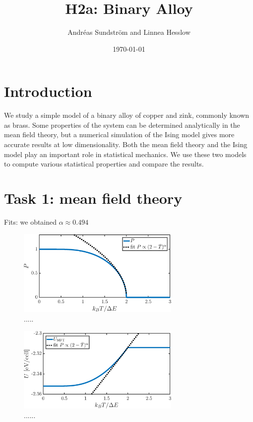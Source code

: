 
\usepackage{units}
\usepackage{physics}

\newcommand{\ee}{\mathrm{e}}
\newcommand{\ii}{\mathrm{i}}

\title{H2a: Binary Alloy}
\author{Andr\'eas Sundstr\"om and Linnea Hesslow}
\date{\today}





\section*{Introduction}
We study a simple model of a binary alloy of copper and zink, commonly known as brass. Some properties of the system can be determined analytically in the mean field theory, but a numerical simulation of the Ising model gives more accurate results at low dimensionality. Both the mean field theory and the Ising model play an important role in statistical mechanics. We use these two models to compute various statistical properties and compare the results. 

\section*{Task 1: mean field theory}
Fits: we obtained $\alpha \approx 0.494$

\begin{figure}[!ht]
\begin{center}
  \includegraphics[width=0.7\textwidth]{../figures/P_MFT} 
  \caption{.....}
  \label{fig:T1:P}
\end{center}
\end{figure}

\begin{figure}[!ht]
\begin{center}
  \includegraphics[width=0.7\textwidth]{../figures/E_MFT} 
  \caption{......}
  \label{fig:T1:E}
\end{center}
\end{figure}

